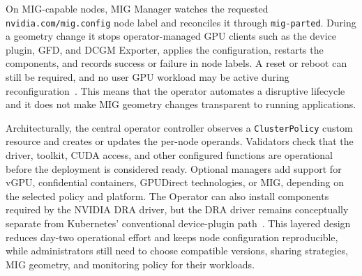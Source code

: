 On MIG-capable nodes, MIG Manager watches the requested \texttt{nvidia.com/mig.config} node label and reconciles it through \texttt{mig-parted}. During a geometry change it stops operator-managed GPU clients such as the device plugin, GFD, and DCGM Exporter, applies the configuration, restarts the components, and records success or failure in node labels. A reset or reboot can still be required, and no user GPU workload may be active during reconfiguration~\cite{nvidia2026gpuoperatormig}. This means that the operator automates a disruptive lifecycle and it does not make MIG geometry changes transparent to running applications.

Architecturally, the central operator controller observes a \texttt{ClusterPolicy} custom resource and creates or updates the per-node operands. Validators check that the driver, toolkit, CUDA access, and other configured functions are operational before the deployment is considered ready. Optional managers add support for vGPU, confidential containers, GPUDirect technologies, or MIG, depending on the selected policy and platform. The Operator can also install components required by the NVIDIA DRA driver, but the DRA driver remains conceptually separate from Kubernetes' conventional device-plugin path~\cite{nvidia2026gpuoperatordra}. This layered design reduces day-two operational effort and keeps node configuration reproducible, while administrators still need to choose compatible versions, sharing strategies, MIG geometry, and monitoring policy for their workloads.
